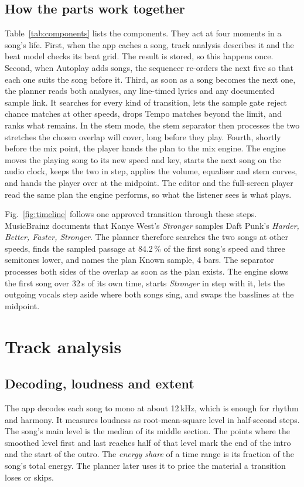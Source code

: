 \documentclass[conference,a4paper]{IEEEtran}
\newcommand{\q}[1]{\textquotedbl{}#1\textquotedbl{}}
\begin{document}
\subsection{How the parts work together}
Table~\ref{tab:components} lists the components. They act at four moments in a song's life. First,
when the app caches a song, track analysis describes it and the beat model checks its beat grid.
The result is stored, so this happens once. Second, when Autoplay adds songs, the sequencer
re-orders the next five so that each one suits the song before it. Third, as soon as a song becomes
the next one, the planner reads both analyses, any line-timed lyrics and any documented sample link.
It searches for every kind of transition, lets the sample gate reject chance matches at other
speeds, drops Tempo matches beyond the limit, and ranks what remains. In the stem mode, the stem
separator then processes the two stretches the chosen overlap will cover, long before they play.
Fourth, shortly before the mix point, the player hands the plan to the mix engine. The engine moves
the playing song to its new speed and key, starts the next song on the audio clock, keeps the two in
step, applies the volume, equaliser and stem curves, and hands the player over at the midpoint. The
editor and the full-screen player read the same plan the engine performs, so what the listener sees
is what plays.

Fig.~\ref{fig:timeline} follows one approved transition through these steps. MusicBrainz documents
that Kanye West's \emph{Stronger} samples Daft Punk's \emph{Harder, Better, Faster, Stronger}. The
planner therefore searches the two songs at other speeds, finds the sampled passage at 84.2\,\% of
the first song's speed and three semitones lower, and names the plan \q{Known sample, 4 bars}. The
separator processes both sides of the overlap as soon as the plan exists. The engine slows the
first song over 32\,s of its own time, starts \emph{Stronger} in step with it, lets the outgoing
vocals step aside where both songs sing, and swaps the basslines at the midpoint.

\section{Track analysis}\label{sec:analysis}

\subsection{Decoding, loudness and extent}
The app decodes each song to mono at about 12\,kHz, which is enough for rhythm and harmony. It
measures loudness as root-mean-square level in half-second steps. The song's main level is the
median of its middle section. The points where the smoothed level first and last reaches half of
that level mark the end of the intro and the start of the outro. The \emph{energy share} of a time
range is its fraction of the song's total energy. The planner later uses it to price the material
a transition loses or skips.
\end{document}
